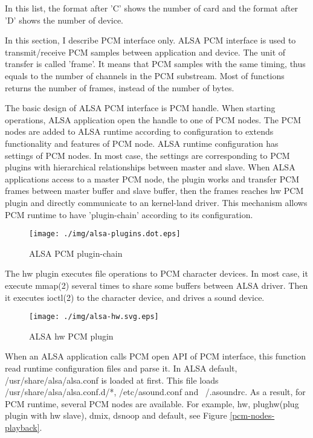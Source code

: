 \documentclass[onecolumn]{article}
\begin{document}
In this list, the format after 'C' shows the number of card and the format after 'D' shows the number of device.

In this section, I describe PCM interface only. ALSA PCM interface is used to transmit/receive PCM samples between application and device. The unit of transfer is called 'frame'. It means that PCM samples with the same timing, thus equals to the number of channels in the PCM substream. Most of functions returns the number of frames, instead of the number of bytes.

The basic design of ALSA PCM interface is PCM handle. When starting operations, ALSA application open the handle to one of PCM nodes. The PCM nodes are added to ALSA runtime according to configuration to extends functionality and features of PCM node. ALSA runtime configuration has settings of PCM nodes. In most case, the settings are corresponding to PCM plugins with hierarchical relationships between master and slave. When ALSA applications access to a master PCM node, the plugin works and transfer PCM frames between master buffer and slave buffer, then the frames reaches hw PCM plugin and directly communicate to an kernel-land driver. This mechanism allows PCM runtime to have 'plugin-chain' according to its configuration. 

\begin{figure}[htbp]
	\centering
	\texttt{[image: ./img/alsa-plugins.dot.eps]}
	\caption{{ALSA PCM plugin-chain}}
	\label{alsa_plugins}
\end{figure}

The hw plugin executes file operations to PCM character devices. In most case, it execute mmap(2) several times to share some buffers between ALSA driver. Then it executes ioctl(2) to the character device, and drives a sound device.

\begin{figure}[htbp]
	\centering
	\texttt{[image: ./img/alsa-hw.svg.eps]}
	\caption{{ALSA hw PCM plugin}}
	\label{alsa_hw_plugin}
\end{figure}

When an ALSA application calls PCM open API of PCM interface, this function read runtime configuration files and parse it. In ALSA default, /usr/share/alsa/alsa.conf is loaded at first. This file loads /usr/share/alsa/alsa.conf.d/*, /etc/asound.conf and ~/.asoundrc. As a result, for PCM runtime, several PCM nodes are available. For example, hw, plughw(plug plugin with hw slave), dmix, dsnoop and default, see Figure \ref{pcm-nodes-playback}.
\end{document}
